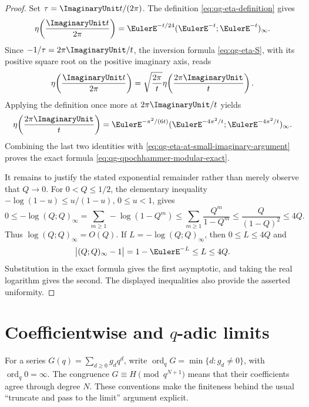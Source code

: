 \begin{proof}
Set \(\tau=\ImaginaryUnit t/(2\pi)\).  The definition
\eqref{eq:qg-eta-definition} gives
\begin{equation}
 \eta\!\left(\frac{\ImaginaryUnit t}{2\pi}\right)
 =\EulerE^{-t/24}(\EulerE^{-t};\EulerE^{-t})_\infty.
\label{eq:qg-eta-at-small-imaginary-argument}
\end{equation}
Since \(-1/\tau=2\pi\ImaginaryUnit/t\), the inversion formula
\eqref{eq:qg-eta-S}, with its positive square root on the positive imaginary
axis, reads
\[
 \eta\!\left(\frac{\ImaginaryUnit t}{2\pi}\right)
 =\sqrt{\frac{2\pi}{t}}
   \eta\!\left(\frac{2\pi\ImaginaryUnit}{t}\right).
\]
Applying the definition once more at \(2\pi\ImaginaryUnit/t\) yields
\[
 \eta\!\left(\frac{2\pi\ImaginaryUnit}{t}\right)
 =\EulerE^{-\pi^2/(6t)}
   (\EulerE^{-4\pi^2/t};\EulerE^{-4\pi^2/t})_\infty.
\]
Combining the last two identities with
\eqref{eq:qg-eta-at-small-imaginary-argument} proves the exact formula
\eqref{eq:qg-qpochhammer-modular-exact}.

It remains to justify the stated exponential remainder rather than merely
observe that \(Q\to0\).  For \(0<Q\le1/2\), the elementary inequality
\(-\log(1-u)\le u/(1-u)\), \(0\le u<1\), gives
\[
 0\le-\log(Q;Q)_\infty
 =\sum_{m\ge1}-\log(1-Q^m)
 \le\sum_{m\ge1}\frac{Q^m}{1-Q^m}
 \le\frac{Q}{(1-Q)^2}
 \le4Q.
\]
Thus \(\log(Q;Q)_\infty=O(Q)\).  If
\(L=-\log(Q;Q)_\infty\), then \(0\le L\le4Q\) and
\[
 \bigl|(Q;Q)_\infty-1\bigr|=1-\EulerE^{-L}\le L\le4Q.
\]
Substitution in the exact formula gives the first asymptotic, and taking the
real logarithm gives the second.  The displayed inequalities also provide
the asserted uniformity.
\end{proof}

\section{\texorpdfstring{Coefficientwise and \(q\)-adic limits}{Coefficientwise and q-adic limits}}

For a series \(G(q)=\sum_{d\ge0}g_dq^d\), write
\(\operatorname{ord}_qG=\min\{d:g_d\ne0\}\), with
\(\operatorname{ord}_q0=\infty\).  The congruence
\(G\equiv H\pmod{q^{N+1}}\) means that their coefficients agree through
degree \(N\).  These conventions make the finiteness behind the usual
“truncate and pass to the limit” argument explicit.

